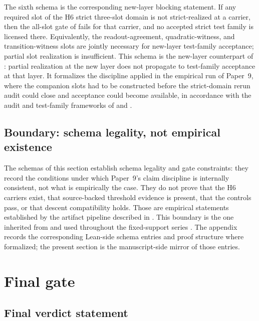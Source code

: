 \documentclass[11pt]{article}
\newcommand{\NewLayer}{H6}
\newcommand{\PaperNine}{Paper~9}
\theoremstyle{definition}
\begin{document}
The sixth schema is the corresponding new-layer blocking statement.  If any
required slot of the \NewLayer{} strict three-slot domain is not strict-realized
at a carrier, then the all-slot gate of
 fails for that carrier,
and no accepted strict test family is licensed there.  Equivalently, the
readout-agreement, quadratic-witness, and transition-witness slots are jointly
necessary for new-layer test-family acceptance; partial slot realization is
insufficient.  This schema is the new-layer counterpart of
: partial realization at the new layer
does not propagate to test-family acceptance at that layer.  It formalizes the
discipline applied in the empirical run of \PaperNine{}, where the companion
slots had to be constructed before the strict-domain rerun audit could close
and acceptance could become available, in accordance with the audit and
test-family frameworks of \cite{Tsiokos2026FoundationsII} and
\cite{Tsiokos2026CarrierToEvent}.

\subsection{Boundary: schema legality, not empirical existence}\label{subsec:schema-legality-not-existence}

The schemas of this section establish schema legality and gate constraints:
they record the conditions under which \PaperNine{}'s claim discipline is
internally consistent, not what is empirically the case.  They do not prove that
the \NewLayer{} carriers exist, that source-backed threshold evidence is
present, that the controls pass, or that descent compatibility holds.  Those
are empirical statements established by the artifact pipeline described in
.  This boundary is
the one inherited from \cite{Tsiokos2026FoundationsII} and used throughout the
fixed-support series
\cite{Tsiokos2026CarrierToEvent,Tsiokos2026CarrierExactification,Tsiokos2026PromotionCriteria,Tsiokos2026InternalStructure}.
The appendix  records the corresponding Lean-side
schema entries and proof structure where formalized; the present section is the
manuscript-side mirror of those entries.
 \section{Final gate}\label{sec:final-gate}

\subsection{Final verdict statement}\label{subsec:final-verdict-statement}
\end{document}
